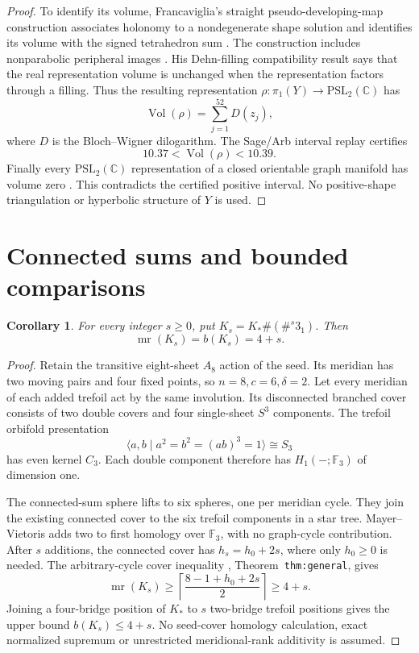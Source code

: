 \documentclass[11pt]{article}
\newtheorem{corollary}[theorem]{Corollary}
\newcommand{\mr}{\operatorname{mr}}
\begin{document}
\begin{proof}
To identify its volume, Francaviglia's straight pseudo-developing-map
construction associates holonomy to a nondegenerate shape solution and
identifies its volume with the signed tetrahedron sum
\cite[Remark~4.4, p.~433]{francaviglia}. The construction includes
nonparabolic peripheral images
\cite[Corollary~4.14 and Remark~4.15, p.~437]{francaviglia}.
His Dehn-filling compatibility result
\cite[Proposition~4.17, p.~437]{francaviglia} says that the real
representation volume is unchanged when the representation factors
through a filling. Thus the resulting representation
$\rho:\pi_1(Y)\to\mathrm{PSL}_2(\mathbb C)$ has
\[
       \operatorname{Vol}(\rho)=\sum_{j=1}^{52}D(z_j),
\]
where $D$ is the Bloch--Wigner dilogarithm. The Sage/Arb interval
replay certifies
\[
                     10.37<\operatorname{Vol}(\rho)<10.39.
\]
Finally every $\mathrm{PSL}_2(\mathbb C)$ representation of a closed
orientable graph manifold has volume zero
\cite[Lemma~4.10, p.~11 of the retained version]{lty}.
This contradicts the certified positive interval.
No positive-shape triangulation or hyperbolic structure of $Y$ is used.
\end{proof}

\section{Connected sums and bounded comparisons}

\begin{corollary}\label{cor:trefoils}
For every integer $s\ge0$, put $K_s=K_*\#(\#^s3_1)$. Then
\[
                         \mr(K_s)=b(K_s)=4+s.
\]
\end{corollary}
\begin{proof}
Retain the transitive eight-sheet $A_8$ action of the seed. Its meridian
has two moving pairs and four fixed points, so $n=8,c=6,\delta=2$.
Let every meridian of each added trefoil act by the same involution.
Its disconnected branched cover consists of two double covers and
four single-sheet $S^3$ components. The trefoil orbifold presentation
\[
             \langle a,b\mid a^2=b^2=(ab)^3=1\rangle\cong S_3
\]
has even kernel $C_3$. Each double component therefore has
$H_1(-;\mathbb F_3)$ of dimension one.

The connected-sum sphere lifts to six spheres, one per meridian cycle.
They join the existing connected cover to the six trefoil components
in a star tree. Mayer--Vietoris adds two to first homology over
$\mathbb F_3$, with no graph-cycle contribution. After $s$ additions,
the connected cover has $h_s=h_0+2s$, where only $h_0\ge0$ is needed.
The arbitrary-cycle cover inequality
,
Theorem~\texttt{thm:general}, gives
\[
 \mr(K_s)\ge\left\lceil\frac{8-1+h_0+2s}{2}\right\rceil\ge4+s.
\]
Joining a four-bridge position of $K_*$ to $s$ two-bridge trefoil
positions gives the upper bound $b(K_s)\le4+s$.
No seed-cover homology calculation, exact normalized supremum or
unrestricted meridional-rank additivity is assumed.
\end{proof}
\end{document}
